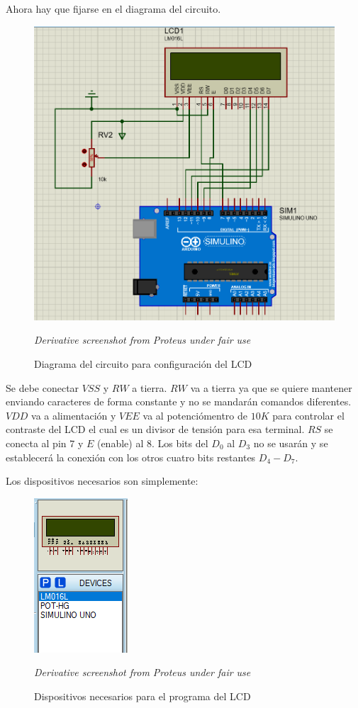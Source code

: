 \documentclass{article}
\begin{document}
    \bigbreak

    Ahora hay que fijarse en el diagrama del circuito.

    \begin{figure}[H]
        \centering
        \includegraphics[width=0.6\paperwidth]{images/sim-schematic}
        \caption{Diagrama del circuito para configuración del LCD}\footnotesize
        \textit{Derivative screenshot from Proteus under fair use}
    \end{figure}

    Se debe conectar $VSS$ y $RW$ a tierra. $RW$ va a tierra ya que se quiere
    mantener enviando caracteres de forma constante y no se mandarán comandos
    diferentes. $VDD$ va a alimentación y $VEE$ va al potenciómentro de $10K$
    para controlar el contraste del LCD el cual es un divisor de tensión para
    esa terminal. $RS$ se conecta al pin $7$ y $E$ (enable) al $8$. Los bits
    del $D_0$ al $D_3$ no se usarán y se establecerá la conexión con los
    otros cuatro bits restantes $D_4-D_7$.

    \bigbreak

    Los dispositivos necesarios son simplemente:

    \begin{figure}[H]
        \centering
        \includegraphics[width=0.2\paperwidth]{images/sim-devices}
        \caption{Dispositivos necesarios para el programa del LCD}\footnotesize
        \textit{Derivative screenshot from Proteus under fair use}
    \end{figure}
\end{document}
